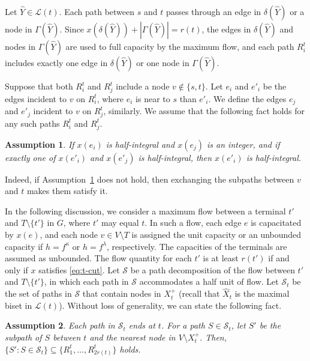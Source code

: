 \documentclass{article}
\newtheorem{assumption}{Assumption}
\newcommand{\Lfam}{\mathcal{L}}
\newcommand{\Sfam}{\mathcal{S}}
\newcommand{\f}{f^{\kappa}}
\newcommand{\g}{f^{\lambda}}
\begin{document}
Let $\hat{Y} \in \Lfam(t)$.
Each path between $s$ and $t$ 
passes through an edge in $\delta(\hat{Y})$ or a node in $\Gamma(\hat{Y})$.
Since $x(\delta(\hat{Y}))+|\Gamma(\hat{Y})|=r(t)$, the edges in $\delta(\hat{Y})$ 
and nodes in $\Gamma(\hat{Y})$ are used to full capacity by the maximum flow,
and each path $R^t_i$ includes exactly one edge in $\delta(\hat{Y})$
or one node in $\Gamma(\hat{Y})$.


Suppose that both $R^t_i$ and $R^t_j$ include a node $v \not\in \{s,t\}$.
Let $e_i$ and $e'_i$ be the edges incident to $v$ on $R^t_i$, where
$e_i$ is near to $s$ than $e'_i$.
We define the edges $e_j$ and $e'_j$ incident to $v$ on $R^t_j$, similarly.
We assume that the following fact holds for any such paths $R^t_i$ and $R^t_j$.

  \begin{assumption}
   \label{assump:stay-half}
   If $x(e_i)$ is half-integral and $x(e_j)$ is an integer,
   and if exactly one of $x(e'_i)$ and $x(e'_j)$ is half-integral,
   then $x(e'_i)$ is half-integral.
  \end{assumption}

Indeed, if Assumption~\ref{assump:stay-half} does not hold, then 
exchanging the subpaths between $v$ and $t$ makes them satisfy it.

In the following discussion, we consider a maximum flow between a terminal $t'$ and $T \setminus \{t'\}$ in $G$, where
$t'$ may equal $t$. In such a flow, each edge $e$ is capacitated by $x(e)$, and each node $v \in V\setminus T$
is assigned the unit capacity or an unbounded capacity if $h=\f$ or $h=\g$, respectively. The capacities of the
terminals are assumed as unbounded. The flow quantity for each $t'$ is at least $r(t')$ if and only if $x$
satisfies \eqref{eq:t-cut}. Let $\Sfam$ be a path decomposition of the
flow between $t'$ and $T\setminus \{t'\}$, in which each path in $\Sfam$
accommodates a half unit of flow. Let $\Sfam_{t}$ be the set of paths in $\Sfam$ that contain nodes in $X^+_t$
(recall that $\hat{X}_t$ is the maximal biset in $\Lfam(t)$). Without loss of generality, we can state the
following fact.

\begin{assumption}\label{assump:path-decomposition}
 Each path in $\Sfam_{t}$ ends at $t$.
 For a path $S \in \Sfam_t$, let $S'$ be the subpath of $S$ between $t$ and the nearest node in
 $V\setminus X^+_t$. 
 Then, $\{S' \colon S \in \Sfam_{t}\} \subseteq
 \{R_1^{t},\ldots,R^t_{2r(t)}\}$ holds.
\end{assumption}
\end{document}
